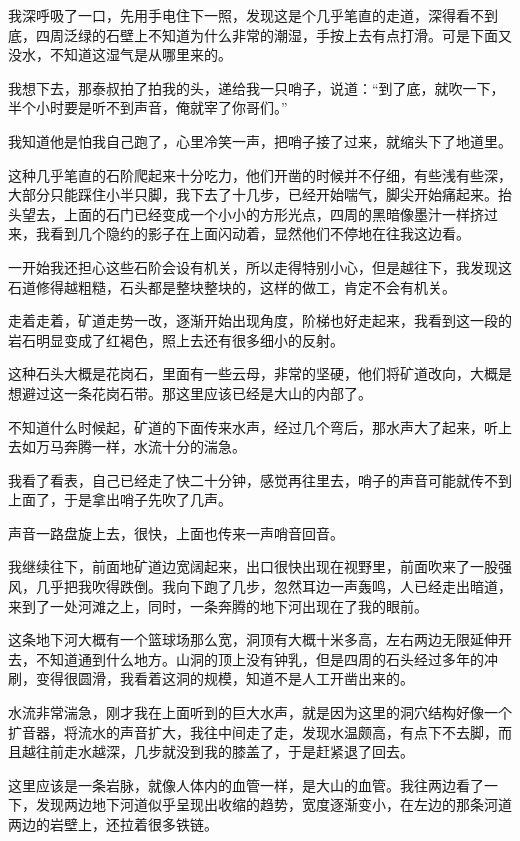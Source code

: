 我深呼吸了一口，先用手电住下一照，发现这是个几乎笔直的走道，深得看不到底，四周泛绿的石壁上不知道为什么非常的潮湿，手按上去有点打滑。可是下面又没水，不知道这湿气是从哪里来的。

我想下去，那泰叔拍了拍我的头，递给我一只哨子，说道：“到了底，就吹一下，半个小时要是听不到声音，俺就宰了你哥们。”

我知道他是怕我自己跑了，心里冷笑一声，把哨子接了过来，就缩头下了地道里。

这种几乎笔直的石阶爬起来十分吃力，他们开凿的时候并不仔细，有些浅有些深，大部分只能踩住小半只脚，我下去了十几步，已经开始喘气，脚尖开始痛起来。抬头望去，上面的石门已经变成一个小小的方形光点，四周的黑暗像墨汁一样挤过来，我看到几个隐约的影子在上面闪动着，显然他们不停地在往我这边看。

一开始我还担心这些石阶会设有机关，所以走得特别小心，但是越往下，我发现这石道修得越粗糙，石头都是整块整块的，这样的做工，肯定不会有机关。

走着走着，矿道走势一改，逐渐开始出现角度，阶梯也好走起来，我看到这一段的岩石明显变成了红褐色，照上去还有很多细小的反射。

这种石头大概是花岗石，里面有一些云母，非常的坚硬，他们将矿道改向，大概是想避过这一条花岗石带。那这里应该已经是大山的内部了。

不知道什么时候起，矿道的下面传来水声，经过几个弯后，那水声大了起来，听上去如万马奔腾一样，水流十分的湍急。

我看了看表，自己已经走了快二十分钟，感觉再往里去，哨子的声音可能就传不到上面了，于是拿出哨子先吹了几声。

声音一路盘旋上去，很快，上面也传来一声哨音回音。

我继续往下，前面地矿道边宽阔起来，出口很快出现在视野里，前面吹来了一股强风，几乎把我吹得跌倒。我向下跑了几步，忽然耳边一声轰鸣，人已经走出暗道，来到了一处河滩之上，同时，一条奔腾的地下河出现在了我的眼前。

这条地下河大概有一个篮球场那么宽，洞顶有大概十米多高，左右两边无限延伸开去，不知道通到什么地方。山洞的顶上没有钟乳，但是四周的石头经过多年的冲刷，变得很圆滑，我看着这洞的规模，知道不是人工开凿出来的。

水流非常湍急，刚才我在上面听到的巨大水声，就是因为这里的洞穴结构好像一个扩音器，将流水的声音扩大，我往中间走了走，发现水温颇高，有点下不去脚，而且越往前走水越深，几步就没到我的膝盖了，于是赶紧退了回去。

这里应该是一条岩脉，就像人体内的血管一样，是大山的血管。我往两边看了一下，发现两边地下河道似乎呈现出收缩的趋势，宽度逐渐变小，在左边的那条河道两边的岩壁上，还拉着很多铁链。


